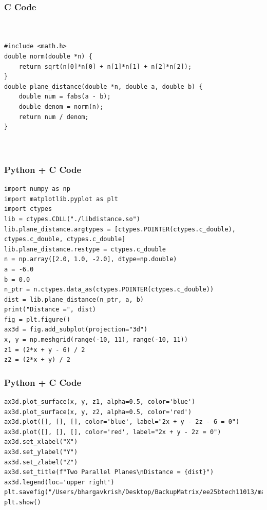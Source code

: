 \documentclass{beamer}
\begin{document}
\begin{frame}[fragile]
    \frametitle{C Code }

    \begin{lstlisting}


#include <math.h>
double norm(double *n) {
    return sqrt(n[0]*n[0] + n[1]*n[1] + n[2]*n[2]);
}
double plane_distance(double *n, double a, double b) {
    double num = fabs(a - b);
    double denom = norm(n);
    return num / denom;
}



    \end{lstlisting}
\end{frame}

\begin{frame}[fragile]
    \frametitle{Python + C Code }

    \begin{lstlisting}
import numpy as np
import matplotlib.pyplot as plt
import ctypes
lib = ctypes.CDLL("./libdistance.so")
lib.plane_distance.argtypes = [ctypes.POINTER(ctypes.c_double), ctypes.c_double, ctypes.c_double]
lib.plane_distance.restype = ctypes.c_double
n = np.array([2.0, 1.0, -2.0], dtype=np.double)
a = -6.0
b = 0.0
n_ptr = n.ctypes.data_as(ctypes.POINTER(ctypes.c_double))
dist = lib.plane_distance(n_ptr, a, b)
print("Distance =", dist)
fig = plt.figure()
ax3d = fig.add_subplot(projection="3d")
x, y = np.meshgrid(range(-10, 11), range(-10, 11))
z1 = (2*x + y - 6) / 2
z2 = (2*x + y) / 2

    \end{lstlisting}
\end{frame}

\begin{frame}[fragile]
    \frametitle{Python + C Code }

    \begin{lstlisting}
ax3d.plot_surface(x, y, z1, alpha=0.5, color='blue')
ax3d.plot_surface(x, y, z2, alpha=0.5, color='red')
ax3d.plot([], [], [], color='blue', label="2x + y - 2z - 6 = 0")
ax3d.plot([], [], [], color='red', label="2x + y - 2z = 0")
ax3d.set_xlabel("X")
ax3d.set_ylabel("Y")
ax3d.set_zlabel("Z")
ax3d.set_title(f"Two Parallel Planes\nDistance = {dist}")
ax3d.legend(loc='upper right')
plt.savefig("/Users/bhargavkrish/Desktop/BackupMatrix/ee25btech11013/matgeo/4.6.1/figs/Figure_1.png")
plt.show()

    \end{lstlisting}
\end{frame}
\end{document}
